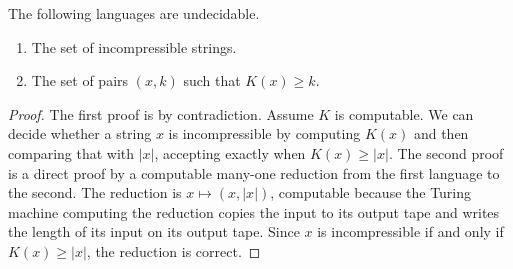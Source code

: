 \begin{corollary}
  The following languages are undecidable.
  \begin{enumerate}
  \item The set of incompressible strings.
  \item The set of pairs $(x, k)$ such that $K(x) \geq k$.
  \end{enumerate}
\end{corollary}
\begin{proof}
  The first proof is by contradiction.
  Assume $K$ is computable.
  We can decide whether a string $x$ is incompressible by computing $K(x)$ and then comparing that with $|x|$, accepting exactly when $K(x) \geq |x|$.
  The second proof is a direct proof by a computable many-one reduction from the first language to the second.
  The reduction is $x \mapsto (x, |x|)$, computable because the Turing machine computing the reduction copies the input to its output tape and writes the length of its input on its output tape.
  Since $x$ is incompressible if and only if $K(x) \geq |x|$, the reduction is correct.
\end{proof}
